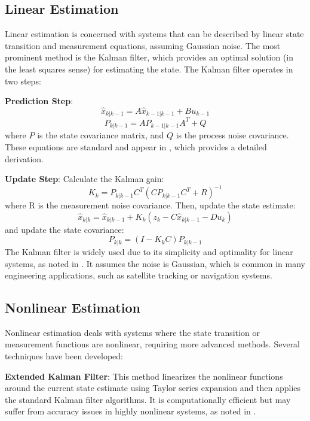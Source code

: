 \subsection{Linear Estimation}
Linear estimation is concerned with systems that can be described by linear state transition and measurement equations, assuming Gaussian noise. The most prominent method is the Kalman filter, which provides an optimal solution (in the least squares sense) for estimating the state. The Kalman filter operates in two steps:

\textbf{Prediction Step}:
\begin{equation}
    \hat{x}_{k|k-1} = A \hat{x}_{k-1|k-1} + B u_{k-1}
\end{equation}
\begin{equation}
    P_{k|k-1} = A P_{k-1|k-1} A^T + Q
\end{equation}
where $P$ is the state covariance matrix, and $Q$ is the process noise covariance. These equations are standard and appear in \cite{Söderström2002}, which provides a detailed derivation.

\textbf{Update Step}:
Calculate the Kalman gain:
\begin{equation}
    K_k = P_{k|k-1} C^T (C P_{k|k-1} C^T + R)^{-1}
\end{equation}
where R is the measurement noise covariance. Then, update the state estimate:
\begin{equation}
    \hat{x}_{k|k} = \hat{x}_{k|k-1} + K_k (z_k - C \hat{x}_{k|k-1} - D u_k)
\end{equation}
and update the state covariance:
\begin{equation}
    P_{k|k} = (I - K_k C) P_{k|k-1}
\end{equation}
The Kalman filter is widely used due to its simplicity and optimality for linear systems, as noted in \cite{VENKATESWARLU2022373}. It assumes the noise is Gaussian, which is common in many engineering applications, such as satellite tracking or navigation systems.

\subsection{Nonlinear Estimation}
Nonlinear estimation deals with systems where the state transition or measurement functions are nonlinear, requiring more advanced methods. Several techniques have been developed:

\textbf{Extended Kalman Filter}:
This method linearizes the nonlinear functions around the current state estimate using Taylor series expansion and then applies the standard Kalman filter algorithms. It is computationally efficient but may suffer from accuracy issues in highly nonlinear systems, as noted in \cite{Rusnak18}.

